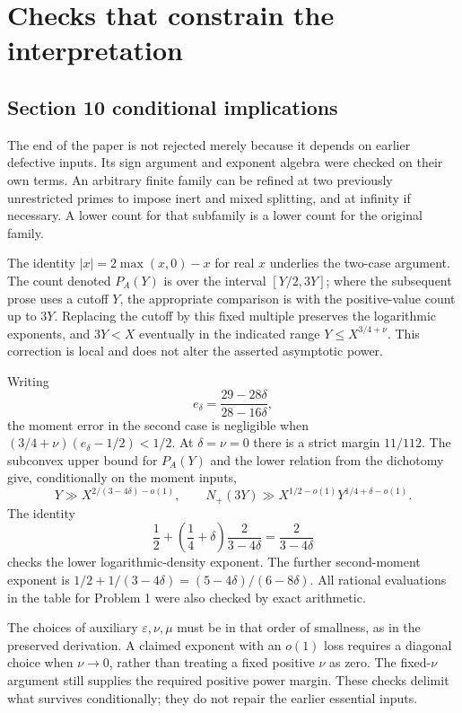 \documentclass[10pt]{article}
\begin{document}
\section*{Checks that constrain the interpretation}
\subsection*{Section 10 conditional implications}
The end of the paper is not rejected merely because it depends on earlier defective inputs. Its sign argument and exponent algebra were checked on their own terms. An arbitrary finite family can be refined at two previously unrestricted primes to impose inert and mixed splitting, and at infinity if necessary. A lower count for that subfamily is a lower count for the original family.\par
The identity \(|x|=2\max(x,0)-x\) for real \(x\) underlies the two-case argument. The count denoted \(P_A(Y)\) is over the interval \([Y/2,3Y]\); where the subsequent prose uses a cutoff \(Y\), the appropriate comparison is with the positive-value count up to \(3Y\). Replacing the cutoff by this fixed multiple preserves the logarithmic exponents, and \(3Y<X\) eventually in the indicated range \(Y\le X^{3/4+\nu}\). This correction is local and does not alter the asserted asymptotic power.\par
Writing \[e_\delta=\frac{29-28\delta}{28-16\delta},\] the moment error in the second case is negligible when \((3/4+\nu)(e_\delta-1/2)<1/2\). At \(\delta=\nu=0\) there is a strict margin \(11/112\). The subconvex upper bound for \(P_A(Y)\) and the lower relation from the dichotomy give, conditionally on the moment inputs, \[Y\gg X^{2/(3-4\delta)-o(1)},\qquad
 N_+(3Y)\gg X^{1/2-o(1)}Y^{1/4+\delta-o(1)}.\] The identity \[\frac12+\left(\frac14+\delta\right)\frac{2}{3-4\delta}
 =\frac{2}{3-4\delta}\] checks the lower logarithmic-density exponent. The further second-moment exponent is \(1/2+1/(3-4\delta)=(5-4\delta)/(6-8\delta)\). All rational evaluations in the table for Problem 1 were also checked by exact arithmetic.\par
The choices of auxiliary \(\varepsilon,\nu,\mu\) must be in that order of smallness, as in the preserved derivation. A claimed exponent with an \(o(1)\) loss requires a diagonal choice when \(\nu\to0\), rather than treating a fixed positive \(\nu\) as zero. The fixed-\(\nu\) argument still supplies the required positive power margin. These checks delimit what survives conditionally; they do not repair the earlier essential inputs.\par
\end{document}
